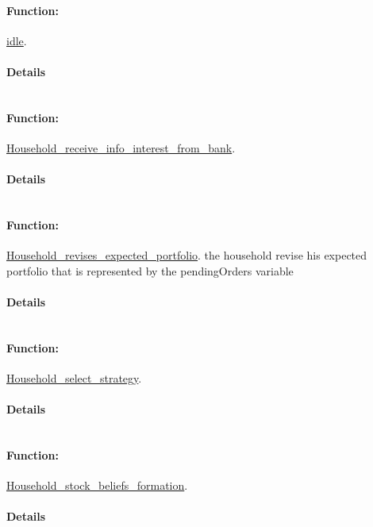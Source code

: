 \documentclass[a4paper,11pt]{article}
\begin{document}
\paragraph{Function:}\url{idle}.

\paragraph{Details}
\begin{verbatim}
\end{verbatim}
\paragraph{Function:}\url{Household_receive_info_interest_from_bank}.

\paragraph{Details}
\begin{verbatim}
\end{verbatim}
\paragraph{Function:}\url{Household_revises_expected_portfolio}.
the household revise his expected portfolio that is represented by the pendingOrders variable 
\paragraph{Details}
\begin{verbatim}
\end{verbatim}
\paragraph{Function:}\url{Household_select_strategy}.

\paragraph{Details}
\begin{verbatim}
\end{verbatim}
\paragraph{Function:}\url{Household_stock_beliefs_formation}.

\paragraph{Details}
\begin{verbatim}
\end{verbatim}
\end{document}
